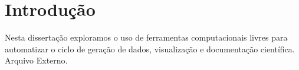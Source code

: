 \section{Introdução}
Nesta dissertação exploramos o uso de ferramentas computacionais livres para automatizar o ciclo de geração de dados,
visualização e documentação científica.
Arquivo Externo.

